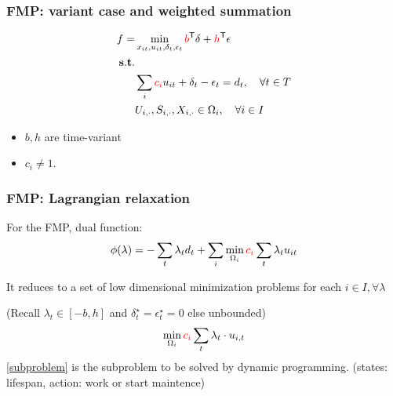 \begin{frame}
  \frametitle{FMP: variant case and weighted summation}
  \begin{align}
    \label{eq:fmp.obj}  f = & \min_{x_{it}, u_{it}, \delta_t, \epsilon_t}
    \textcolor{red}{b}^\mathsf{T}  \delta + \textcolor{red}{h}^\mathsf{T}\epsilon                                   \\
    \nonumber \mathbf{s.t.} &                                                                                       \\
    \label{eq:fmp.demand}   & \sum_i \textcolor{red}{c_i} u_{it} + \delta_t - \epsilon_t = d_t,\quad\forall t \in T \\
                            & U_{i, \cdot}, S_{i, \cdot}, X_{i, \cdot} \in \Omega_i,\quad \forall i\in I
  \end{align}
  \begin{itemize}
    \item \(b, h\) are time-variant
    \item \(c_i \neq 1\).
  \end{itemize}
\end{frame}


\begin{frame}
  \frametitle{FMP: Lagrangian relaxation}
  For the FMP, dual function:
  \[\begin{aligned}
      \phi(\lambda) & = - \sum_t \lambda_t d_t + \sum_i  \min_{\Omega_i} \textcolor{red}{c_i} \sum_t \lambda_t u_{it} \\
    \end{aligned}\]

  It reduces to a set of low dimensional minimization problems for each \(i \in I, \forall \lambda\)

  (Recall \(\lambda_t \in [-b, h] \) and \(\delta_t^\star = \epsilon_t^\star = 0\) else unbounded)
  \begin{equation}\label{subproblem}\begin{aligned}
      \min_{\Omega_i} \textcolor{red}{c_i} \sum_t \lambda_t \cdot u_{i,t}
    \end{aligned}\end{equation}
  \eqref{subproblem} is the subproblem to be solved by dynamic programming. (states: lifespan, action: work or start maintence)
\end{frame}

